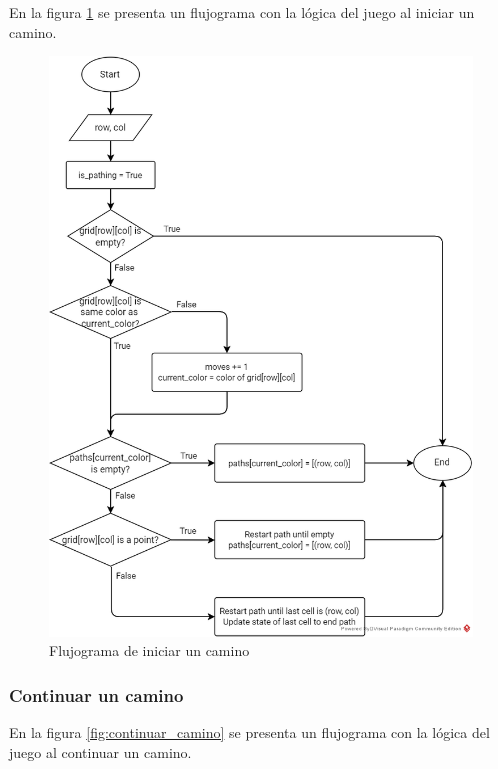 \documentclass[letter,12pt]{article}
\begin{document}
En la figura \ref{fig:iniciar_camino} se presenta un flujograma con la lógica del juego al iniciar un camino. \par

\begin{figure}[ht!]
	\centering
	\includegraphics[scale=0.7]{img/fc_start_path.png}
	\caption{Flujograma de iniciar un camino}
	\label{fig:iniciar_camino}
\end{figure}

\subsubsection{Continuar un camino} \label{diseño:logica:continuar}

En la figura \ref{fig:continuar_camino} se presenta un flujograma con la lógica del juego al continuar un camino. \par
\end{document}
